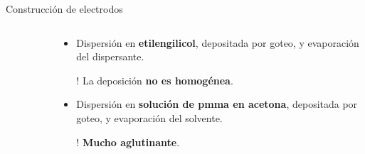 \documentclass[aspectratio=169]{beamer}
\begin{document}
\begin{frame}{Construcción de electrodos}
\begin{columns}
\begin{column}{0.3\textwidth}
\begin{figure}
				\end{figure}
			\end{column}
			\begin{column}{0.6\textwidth}
				\begin{itemize}[<+->]
					\item Dispersión en \textbf{etilengilicol}, depositada por goteo, y evaporación del dispersante.
					\item[!] La deposición \textbf{no es homogénea}.
					\item Dispersión en \textbf{solución de pmma en acetona}, depositada por goteo, y evaporación del solvente.
					\item[!] \textbf{Mucho aglutinante}.
				\end{itemize}
			\end{column}
		\end{columns}		
	\end{frame}
\end{document}
